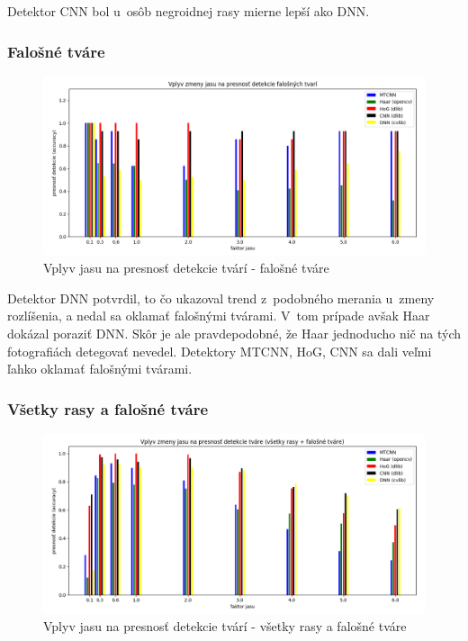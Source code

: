 \documentclass[]{article}
\begin{document}
	Detektor CNN bol u~osôb negroidnej rasy mierne lepší ako DNN.

	\subsubsection*{Falošné tváre}
	\begin{figure}[h!]
		\includegraphics[width=\textwidth]{Vysledky_jas/fake/Figure_1.png}
		\caption{Vplyv jasu na presnosť detekcie tvárí \-- falošné tváre}
	\end{figure}

	Detektor DNN potvrdil, to čo ukazoval trend z~podobného merania u~zmeny rozlíšenia, a nedal sa oklamať falošnými tvárami. V~tom prípade avšak Haar dokázal poraziť DNN. Skôr je ale pravdepodobné, že Haar jednoducho nič na tých fotografiách detegovať nevedel. Detektory MTCNN, HoG, CNN sa dali veľmi ľahko oklamať falošnými tvárami.
	
	\subsubsection*{Všetky rasy a falošné tváre}
	\begin{figure}[h!]
		\includegraphics[width=\textwidth]{Vysledky_jas/all/Figure_1.png}
		\caption{Vplyv jasu na presnosť detekcie tvárí - všetky rasy a falošné tváre}
	\end{figure}
\end{document}
